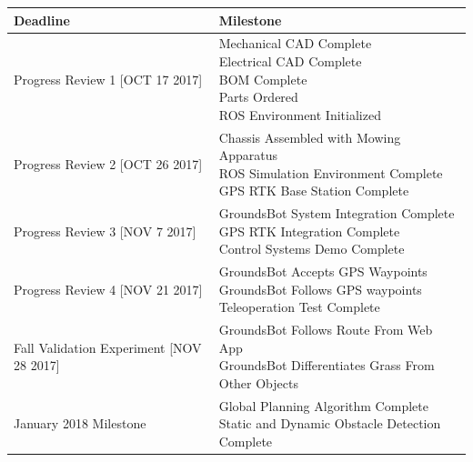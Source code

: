 \documentclass{article}
\begin{document}
\begin{table}[H]
\begin{tabular}{|l|l|}
\hline
Deadline & Milestone                            \\
\hline
Progress Review 1 [OCT 17 2017] &
  \makecell[l]{
    Mechanical CAD Complete                     \\
    Electrical CAD Complete                     \\
    BOM Complete                                \\
    Parts Ordered                               \\
    ROS Environment Initialized                 \\
  }                                             \\
  \hline
Progress Review 2 [OCT 26 2017] &
  \makecell[l]{
    Chassis Assembled with Mowing Apparatus     \\
    ROS Simulation Environment Complete         \\
    GPS RTK Base Station Complete               \\
  }                                             \\ 
  \hline
Progress Review 3 [NOV 7 2017] &
  \makecell[l]{
    GroundsBot System Integration Complete      \\
    GPS RTK Integration Complete                \\
    Control Systems Demo Complete               \\
  }                                             \\
  \hline
Progress Review 4 [NOV 21 2017] &
  \makecell[l]{
    GroundsBot Accepts GPS Waypoints            \\
    GroundsBot Follows GPS waypoints            \\
    Teleoperation Test Complete                 \\
  }                                             \\
  \hline
Fall Validation Experiment [NOV 28 2017] &
  \makecell[l]{
    GroundsBot Follows Route From Web App       \\
    GroundsBot Differentiates Grass From Other Objects
  }                                             \\
  \hline
January 2018 Milestone &
  \makecell[l]{
    Global Planning Algorithm Complete          \\
    Static and Dynamic Obstacle Detection Complete\\
}
\end{tabular}
\end{table}
\end{document}
